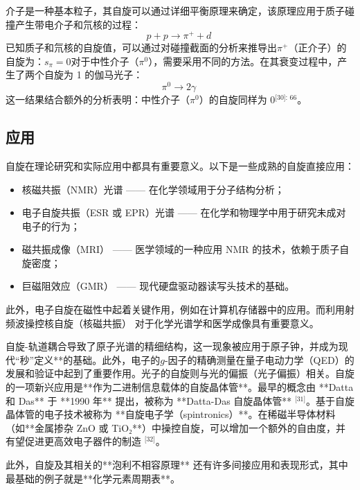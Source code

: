 介子是一种基本粒子，其自旋可以通过详细平衡原理来确定，该原理应用于质子碰撞产生带电介子和氘核的过程：
\[
p + p \rightarrow \pi^+ + d~
\]
已知质子和氘核的自旋值，可以通过对碰撞截面的分析来推导出\(\pi^+\)（正介子）的自旋为：\(s_{\pi} = 0\)对于中性介子（\(\pi^0\)），需要采用不同的方法。在其衰变过程中，产生了两个自旋为 1 的伽马光子：
\[
\pi^0 \rightarrow 2\gamma~
\]
这一结果结合额外的分析表明：中性介子（\(\pi^0\)）的自旋同样为 0\(^\text{[30]: 66}\)。
\subsection{应用} 
自旋在理论研究和实际应用中都具有重要意义。以下是一些成熟的自旋直接应用：  
\begin{itemize}
\item 核磁共振（NMR）光谱 —— 在化学领域用于分子结构分析；  
\item 电子自旋共振（ESR 或 EPR）光谱 —— 在化学和物理学中用于研究未成对电子的行为；  
\item 磁共振成像（MRI） —— 医学领域的一种应用 NMR 的技术，依赖于质子自旋密度；  
\item 巨磁阻效应（GMR） —— 现代硬盘驱动器读写头技术的基础。  
\end{itemize}
此外，电子自旋在磁性中起着关键作用，例如在计算机存储器中的应用。而利用射频波操控核自旋（核磁共振） 对于化学光谱学和医学成像具有重要意义。

自旋-轨道耦合导致了原子光谱的精细结构，这一现象被应用于原子钟，并成为现代“秒”定义**的基础。此外，电子的\( g \)-因子的精确测量在量子电动力学（QED）的发展和验证中起到了重要作用。光子的自旋则与光的偏振（光子偏振）相关。自旋的一项新兴应用是**作为二进制信息载体的自旋晶体管**。最早的概念由 **Datta 和 Das** 于 **1990 年** 提出，被称为 **Datta-Das 自旋晶体管** \(^\text{[31]}\)。基于自旋晶体管的电子技术被称为 **自旋电子学（spintronics）**。在稀磁半导体材料（如**金属掺杂 ZnO 或 TiO₂**）中操控自旋，可以增加一个额外的自由度，并有望促进更高效电子器件的制造 \(^\text{[32]}\)。  

此外，自旋及其相关的**泡利不相容原理** 还有许多间接应用和表现形式，其中最基础的例子就是**化学元素周期表**。